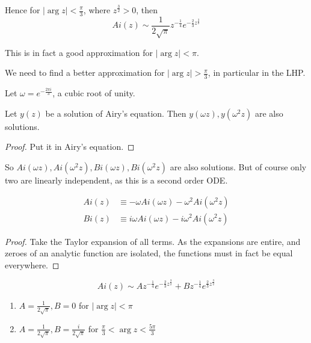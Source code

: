 \documentclass[a4paper]{article}
\begin{document}
\begin{eg}
	Hence for  $|\arg z| < \frac{\pi}{3}$, where $z^{\frac{3}{2}} > 0$, then
	\[
		Ai(z) \sim \frac{1}{2\sqrt{\pi} } z^{-\frac{1}{4}} e^{-\frac{2}{3}z^{\frac{3}{2}}}
	\] 

	This is in fact a good approximation for $|\arg z| < \pi$.

	We need to find a better approximation for $|\arg z| > \frac{\pi}{3}$, in particular in the LHP.

\begin{prop}
	Let $\omega = e^{-\frac{2\pi i }{3}}$, a cubic root of unity.

	Let $y(z)$ be a solution of Airy's equation. Then $y(\omega z), y(\omega^2 z)$ are also solutions.
\end{prop}
\begin{proof}
	Put it in Airy's equation.
\end{proof}

So $Ai(\omega z), Ai(\omega^2 z), Bi(\omega z), Bi(\omega^2 z)$ are also solutions. But of course only two are linearly independent, as this is a second order ODE.

\begin{prop}
	\begin{align*}
		Ai(z) &\equiv -\omega Ai(\omega z) - \omega^2 Ai(\omega ^2 z) \\
		Bi(z) &\equiv i\omega Ai(\omega z) - i\omega^2 Ai(\omega^2 z)
	\end{align*}
\end{prop}

\begin{proof}
	Take the Taylor expansion of all terms. As the expansions are entire, and zeroes of an analytic function are isolated, the functions must in fact be equal everywhere.
\end{proof}

\begin{prop}
	\[
		Ai(z) \sim A z^{-\frac{1}{4}} e^{-\frac{2}{3} z^{\frac{3}{2}}} + B z^{-\frac{1}{4}} e^{\frac{2}{3}z^{\frac{3}{2}}}
	\] 

	\begin{enumerate}
		\item $A = \frac{1}{2\sqrt{\pi} }, B = 0$ for $|\arg z| < \pi$ \\
		\item $A = \frac{1}{2\sqrt{\pi} }, B = \frac{i}{2\sqrt{\pi} }$ for $\frac{\pi}{3} < \arg z < \frac{5\pi}{3}$
	\end{enumerate}
\end{prop}


\end{eg}
\end{document}
